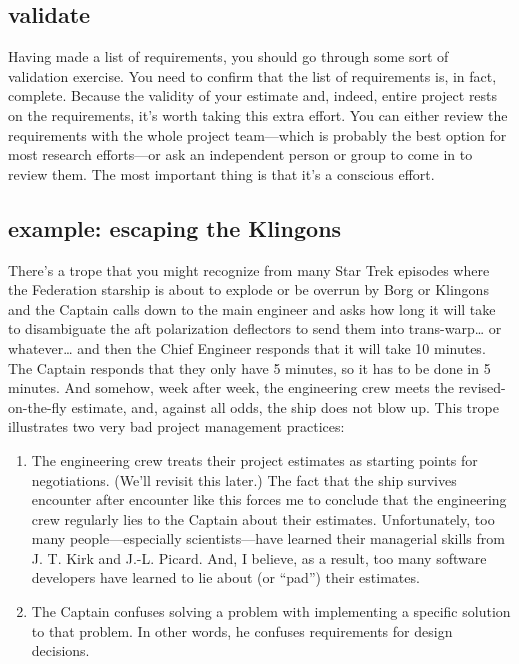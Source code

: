 \documentclass[12pt,oneside]{book}
\begin{document}
\subsection*{validate}

Having made a list of requirements, you should go through some sort of validation exercise. You need to confirm that the list of requirements is, in fact, complete. Because the validity of your estimate and, indeed, entire project rests on the requirements, it's worth taking this extra effort. You can either review the requirements with the whole project team---which is probably the best option for most research efforts---or ask an independent person or group to come in to review them. The most important thing is that it's a conscious effort.

\subsection*{example: escaping the Klingons}

There's a trope that you might recognize from many Star Trek episodes where the Federation starship is about to explode or be overrun by Borg or Klingons and the Captain calls down to the main engineer and asks how long it will take to disambiguate the aft polarization deflectors to send them into trans-warp{\ldots} or whatever{\ldots} and then the Chief Engineer responds that it will take 10 minutes. The Captain responds that they only have 5 minutes, so it has to be done in 5 minutes. And somehow, week after week, the engineering crew meets the revised-on-the-fly estimate, and, against all odds, the ship does not blow up.
This trope illustrates two very bad project management practices:
\begin{enumerate}
\item The engineering crew treats their project estimates as starting points for negotiations. (We'll revisit this later.) The fact that the ship survives encounter after encounter like this forces me to conclude that the engineering crew regularly lies to the Captain about their estimates. Unfortunately, too many people---especially scientists---have learned their managerial skills from J. T. Kirk and J.-L. Picard. And, I believe, as a result, too many software developers have learned to lie about (or ``pad'') their estimates.
\item The Captain confuses solving a problem with implementing a specific solution to that problem. In other words, he confuses requirements for design decisions.
\end{enumerate}
\end{document}
